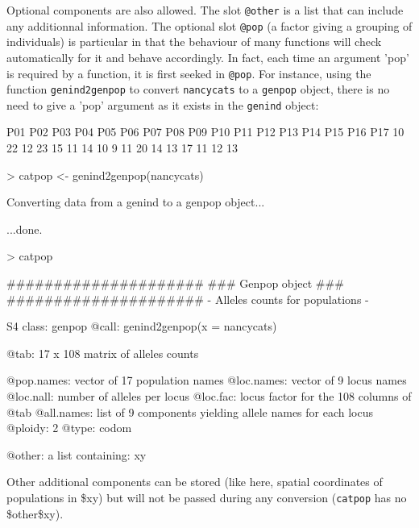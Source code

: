 \documentclass{article}
\begin{document}
Optional components are also allowed.
The slot \texttt{@other} is a list that can include any additionnal information.
The optional slot \texttt{@pop} (a factor giving a grouping of individuals) is particular in that the behaviour of many functions will check automatically for it and behave accordingly.
In fact, each time an argument 'pop' is required by a function, it is first seeked in \texttt{@pop}.
For instance, using the function \texttt{genind2genpop} to convert \texttt{nancycats} to a \texttt{genpop} object, there is no need to give a 'pop' argument as it exists in the \texttt{genind} object:
\begin{Schunk}
\begin{Soutput}
P01 P02 P03 P04 P05 P06 P07 P08 P09 P10 P11 P12 P13 P14 P15 P16 P17 
 10  22  12  23  15  11  14  10   9  11  20  14  13  17  11  12  13 
\end{Soutput}
\begin{Sinput}
> catpop <- genind2genpop(nancycats)
\end{Sinput}
\begin{Soutput}
 Converting data from a genind to a genpop object... 

...done.
\end{Soutput}
\begin{Sinput}
> catpop
\end{Sinput}
\begin{Soutput}
       #####################
       ### Genpop object ### 
       #####################
- Alleles counts for populations - 

S4 class:  genpop
@call: genind2genpop(x = nancycats)

@tab:  17 x 108 matrix of alleles counts

@pop.names: vector of  17 population names
@loc.names: vector of  9 locus names
@loc.nall: number of alleles per locus
@loc.fac: locus factor for the  108 columns of @tab
@all.names: list of  9 components yielding allele names for each locus
@ploidy:  2
@type:  codom

@other: a list containing: xy 
\end{Soutput}
\end{Schunk}
Other additional components can be stored (like here, spatial coordinates of populations in \$xy) but will not be passed during any conversion (\texttt{catpop} has no \$other\$xy).
\end{document}
